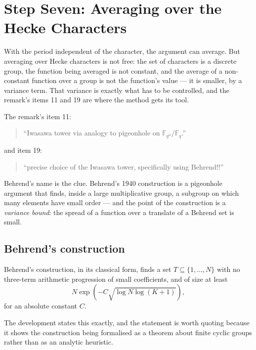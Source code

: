 
\chapter{Step Seven: Averaging over the Hecke Characters}
\label{ch:averaging}

With the period independent of the character, the argument can average. But
averaging over Hecke characters is not free: the set of characters is a
discrete group, the function being averaged is not constant, and the average
of a non-constant function over a group is not the function's value --- it is
smaller, by a variance term. That variance is exactly what has to be
controlled, and the remark's items 11 and 19 are where the method gets its
tool.

The remark's item 11:

\begin{quote}
\small
``Iwasawa tower via analogy to pigeonhole on $\mathbb{F}_{q^n}/\mathbb{F}_q$.''
\end{quote}

and item 19:

\begin{quote}
\small
``precise choice of the Iwasawa tower, specifically using Behrend!!''
\end{quote}

Behrend's name is the clue. Behrend's 1940 construction is a pigeonhole
argument that finds, inside a large multiplicative group, a subgroup on which
many elements have small order --- and the point of the construction is a
\emph{variance bound}: the spread of a function over a translate of a Behrend
set is small.

\section{Behrend's construction}Behrend's construction, in its classical form, finds a set $T \subseteq
\{1,\dots,N\}$ with no three-term arithmetic progression of small
coefficients, and of size at least
\begin{equation}
N \exp\!\left(-C\sqrt{\log N \log(K+1)}\right),
\label{eq:behrendbound}
\end{equation}
for an absolute constant $C$.

The development states this exactly, and the statement is worth quoting
because it shows the construction being formalised as a theorem about finite
cyclic groups rather than as an analytic heuristic.

